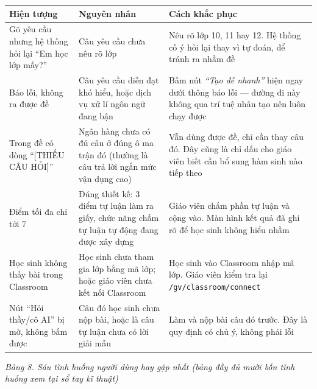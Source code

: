 \begin{center}
\begin{longtable}{|p{4.2cm}|p{4.0cm}|p{5.2cm}|}
\hline
\textbf{Hiện tượng} & \textbf{Nguyên nhân} & \textbf{Cách khắc phục} \\ \hline
\endhead
Gõ yêu cầu nhưng hệ thống hỏi lại ``Em học lớp mấy?'' &
Câu yêu cầu chưa nêu rõ lớp &
Nêu rõ lớp 10, 11 hay 12. Hệ thống cố ý hỏi lại thay vì tự đoán, để tránh ra
nhầm đề \\ \hline

Báo lỗi, không ra được đề &
Câu yêu cầu diễn đạt khó hiểu, hoặc dịch vụ xử lí ngôn ngữ đang bận &
Bấm nút \textit{``Tạo đề nhanh''} hiện ngay dưới thông báo lỗi --- đường đi này
không qua trí tuệ nhân tạo nên luôn chạy được \\ \hline

Trong đề có dòng ``[THIẾU CÂU HỎI]'' &
Ngân hàng chưa có đủ câu ở đúng ô ma trận đó (thường là câu trả lời ngắn mức
vận dụng cao) &
Vẫn dùng được đề, chỉ cần thay câu đó. Đây cũng là chỉ dấu cho giáo viên biết
cần bổ sung hàm sinh nào tiếp theo \\ \hline

Điểm tối đa chỉ tới 7 &
Đúng thiết kế: 3 điểm tự luận làm ra giấy, chức năng chấm tự luận tự động đang
được xây dựng &
Giáo viên chấm phần tự luận và cộng vào. Màn hình kết quả đã ghi rõ để học sinh
không hiểu nhầm \\ \hline

Học sinh không thấy bài trong Classroom &
Học sinh chưa tham gia lớp bằng mã lớp; hoặc giáo viên chưa kết nối Classroom &
Học sinh vào Classroom nhập mã lớp. Giáo viên kiểm tra lại
\texttt{/gv/classroom/connect} \\ \hline

Nút ``Hỏi thầy/cô AI'' bị mờ, không bấm được &
Câu đó học sinh chưa nộp bài, hoặc là câu tự luận chưa có lời giải mẫu &
Làm và nộp bài câu đó trước. Đây là quy định có chủ ý, không phải lỗi \\ \hline
\end{longtable}
\end{center}
\textit{Bảng 8. Sáu tình huống người dùng hay gặp nhất (bảng đầy đủ mười bốn tình huống xem tại sổ tay kĩ thuật)}



\bigskip
